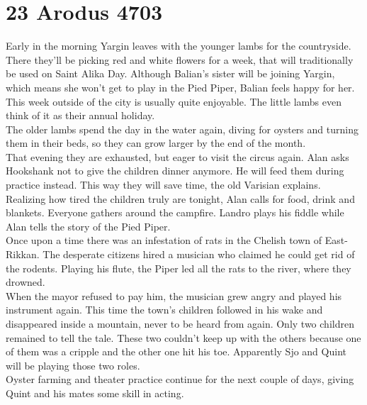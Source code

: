 \section{23 Arodus 4703}

Early in the morning Yargin leaves with the younger lambs for the countryside. There they'll be picking red and white flowers for a week, that will traditionally be used on Saint Alika Day. Although Balian's sister will be joining Yargin, which means she won't get to play in the Pied Piper, Balian feels happy for her. This week outside of the city is usually quite enjoyable. The little lambs even think of it as their annual holiday.\\

The older lambs spend the day in the water again, diving for oysters and turning them in their beds, so they can grow larger by the end of the month.\\

That evening they are exhausted, but eager to visit the circus again. Alan asks Hookshank not to give the children dinner anymore. He will feed them during practice instead. This way they will save time, the old Varisian explains. Realizing how tired the children truly are tonight, Alan calls for food, drink and blankets. Everyone gathers around the campfire. Landro plays his fiddle while Alan tells the story of the Pied Piper.\\

Once upon a time there was an infestation of rats in the Chelish town of East-Rikkan. The desperate citizens hired a musician who claimed he could get rid of the rodents. Playing his flute, the Piper led all the rats to the river, where they drowned.\\

When the mayor refused to pay him, the musician grew angry and played his instrument again. This time the town's children followed in his wake and disappeared inside a mountain, never to be heard from again. Only two children remained to tell the tale. These two couldn't keep up with the others because one of them was a cripple and the other one hit his toe. Apparently Sjo and Quint will be playing those two roles.\\

Oyster farming and theater practice continue for the next couple of days, giving Quint and his mates some skill in acting.\\

